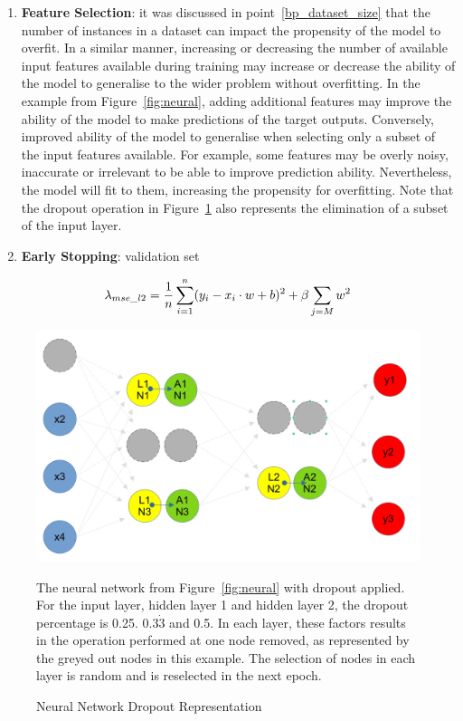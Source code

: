 \begin{enumerate}
	
	\item \textbf{Feature Selection}: it was discussed in point~\ref{bp_dataset_size} that the number of instances in a dataset can impact the propensity of the model to overfit. In a similar manner, increasing or decreasing the number of available input features available during training may increase or decrease the ability of the model to generalise to the wider problem without overfitting. In the example from Figure~\ref{fig:neural}, adding additional features may improve the ability of the model to make predictions of the target outputs. Conversely, improved ability of the model to generalise when selecting only a subset of the input features available.  For example, some features may be overly noisy, inaccurate or irrelevant to be able to improve prediction ability. Nevertheless, the model will fit to them, increasing the propensity for overfitting. Note that the dropout operation in Figure~\ref{fig:neuralDO} also represents the elimination of a subset of the input layer.
	
	\item \textbf{Early Stopping}: validation set
	
\end{enumerate} 

\begin{equation} \label{mse_l2}
	\lambda_{mse\_l2} = \frac{1}{n}\sum_{i=1}^n (y_i -  x_i \space \cdot \space w + b)^2 + \beta {}\sum_{j=M}w^2
\end{equation}

\begin{figure}[p]
	\centering
	\includegraphics[scale=0.3]{Figures/neural_dropout.jpeg}
	\caption{Neural Network Dropout Representation} {The neural network from Figure~\ref{fig:neural} with dropout applied. For the input layer, hidden layer 1 and hidden layer 2, the dropout percentage is 0.25. 0.3$\dot{3}$} and 0.5. In each layer, these factors results in the operation performed at one node removed, as represented by the greyed out nodes in this example. The selection of nodes in each layer is random and is reselected in the next epoch.
	\label{fig:neuralDO}
\end{figure}


